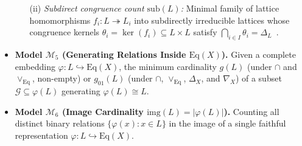 \documentclass[11pt]{article}
\theoremstyle{definition}
\theoremstyle{remark}
\newcommand{\Eq}{\mathrm{Eq}}
\begin{document}
\begin{itemize}
\begin{enumerate}
  \item[(ii)] \emph{Subdirect congruence count $\mathrm{sub}(L)$:} Minimal family of lattice homomorphisms $f_i \colon L \twoheadrightarrow L_i$ into subdirectly irreducible lattices whose congruence kernels $\theta_i = \ker(f_i) \subseteq L \times L$ satisfy $\bigcap_{i \in I} \theta_i = \Delta_L$~\cite{Birkhoff1944}.
  \end{enumerate}
\item \textbf{Model $\mathcal{M}_5$ (Generating Relations Inside $\Eq(X)$).} Given a complete embedding $\varphi \colon L \hookrightarrow \Eq(X)$, the minimum cardinality $g(L)$ (under $\cap$ and $\vee_{\Eq}$, non-empty) or $g_{01}(L)$ (under $\cap$, $\vee_{\Eq}$, $\Delta_X$, and $\nabla_X$) of a subset $\mathcal{G} \subseteq \varphi(L)$ generating $\varphi(L) \cong L$.
\item \textbf{Model $\mathcal{M}_6$ (Image Cardinality $\mathrm{img}(L) = |\varphi(L)|$).} Counting all distinct binary relations $\{\varphi(x) : x \in L\}$ in the image of a single faithful representation $\varphi \colon L \hookrightarrow \Eq(X)$.
\end{itemize}
\end{document}
